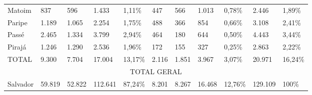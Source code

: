 \begin{table}[!htp]
{\begin{minipage}{18cm}
\begin{tiny}
\begin{tabular}{m{1.3cm} m{1cm} m{1cm} m{1.1cm}  m{1cm} m{0.7cm} m{0.7cm} m{1.1cm} m{1cm} m{1cm} m{1cm}}
Matoim	&837	&596	&1.433	&1,11\%	&447	&566	&1.013	&0,78\%	&2.446	&1,89\%	\\
Paripe	&1.189	&1.065	&2.254	&1,75\%	&488	&366	&854	&0,66\%	&3.108	&2,41\%	\\
Passé	&2.465	&1.334	&3.799	&2,94\%	&464	&180	&644	&0,50\%	&4.443	&3,44\%	\\
Pirajá	&1.246	&1.290	&2.536	&1,96\%	&172	&155	&327	&0,25\%	&2.863	&2,22\% \\
TOTAL	&9.300	&7.704	&17.004	&13,17\%	&2.116	&1.851	&3.967	&3,07\%	&20.971	&16,24\%	\\
\hline
\multicolumn{11}{c}{TOTAL GERAL}\\
\hline
Salvador	&59.819	&52.822	&112.641	&87,24\%	&8.201	&8.267	&16.468	&12,76\%	&129.109	&100\% \\
\hline
\end{tabular} 
\end{tiny}
\end{minipage}
}
{}
\end{table}
